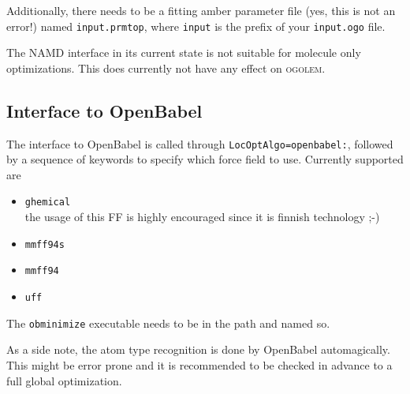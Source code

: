 \documentclass[a4paper,10pt]{scrbook}
\newcommand{\ogo}{\textsc{ogolem}}
\begin{document}
Additionally, there needs to be a fitting amber parameter file (yes, this is
not an error!) named \texttt{input.prmtop}, where \texttt{input} is the prefix
of your \texttt{input.ogo} file.

The NAMD interface in its current state is not suitable for molecule only
optimizations. This does currently not have any effect on \ogo{}.

\subsection{Interface to OpenBabel}
The interface to OpenBabel is called through \texttt{LocOptAlgo=openbabel:},
followed by a sequence of keywords to specify which force field to use.
Currently supported are
\begin{itemize}
  \item \texttt{ghemical}\\
	the usage of this FF is highly encouraged since it is finnish
technology ;-)
  \item \texttt{mmff94s}
  \item \texttt{mmff94}
  \item \texttt{uff}
\end{itemize}

The \texttt{obminimize} executable needs to be in the path and named so.

As a side note, the atom type recognition is done by OpenBabel automagically.
This might be error prone and it is recommended to be checked in advance to a
full global optimization.
\end{document}
